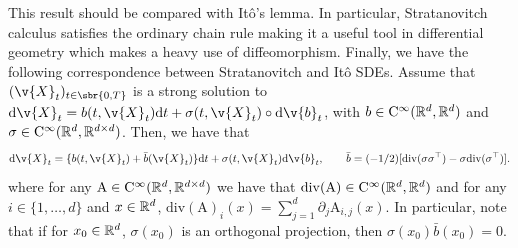 This result should be compared with It\^o's lemma.
In particular, Stratanovitch calculus satisfies the ordinary chain rule making it a useful tool in differential geometry which makes a heavy use of diffeomorphism.
Finally, we have the following correspondence between Stratanovitch and It\^o SDEs.
Assume that $(\v{X}_t)_{t \in \sbr{0,T}}$ is a strong solution to $\mathrm{d} \v{X}_t = b(t, \v{X}_t) \mathrm{d} t + \sigma(t, \v{X}_t) \circ \mathrm{d} \v{b}_t$, with $b \in \mathrm{C}^\infty(\mathbb{R}^d, \mathbb{R}^d)$ and $\sigma \in \mathrm{C}^\infty(\mathbb{R}^d, \mathbb{R}^{d \times d})$.
Then, we have that \begin{equation} \label{eq:strata_ito_transfo_sde} \mathrm{d} \v{X}_t = \{ b(t, \v{X}_t) + \bar{b}(\v{X}_t)\}\mathrm{d} t + \sigma(t, \v{X}_t) \mathrm{d} \v{b}_t , \qquad \bar{b} = (-1/2) [\mathrm{div}(\sigma \sigma^\top) - \sigma \mathrm{div}(\sigma^\top)] .
\end{equation}
where for any $\mathrm{A} \in \mathrm{C}^\infty(\mathbb{R}^d, \mathbb{R}^{d \times d})$ we have that
$\mathrm{div}(\mathrm{A}) \in \mathrm{C}^\infty(\mathbb{R}^d, \mathbb{R}^d)$ and for any
$i \in \{1, \dots, d\}$ and $x \in \mathbb{R}^d$,
$\mathrm{div}(\mathrm{A})_i(x) = \sum_{j=1}^d \partial_j \mathrm{A}_{i,j}(x)$.
In particular, note that if for $x_0 \in \mathbb{R}^d$, $\sigma(x_0)$ is an orthogonal projection, then $\sigma(x_0) \bar{b}(x_0) = 0$.


